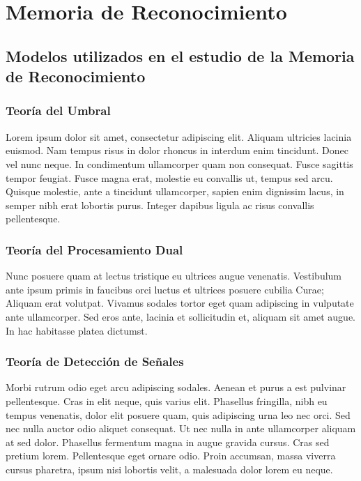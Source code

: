 
\chapter{Memoria de Reconocimiento} %

\label{Cap_RM} %


\section{Modelos utilizados en el estudio de la Memoria de Reconocimiento}

\subsection{Teoría del Umbral}

Lorem ipsum dolor sit amet, consectetur adipiscing elit. Aliquam ultricies lacinia euismod. Nam tempus risus in dolor rhoncus in interdum enim tincidunt. Donec vel nunc neque. In condimentum ullamcorper quam non consequat. Fusce sagittis tempor feugiat. Fusce magna erat, molestie eu convallis ut, tempus sed arcu. Quisque molestie, ante a tincidunt ullamcorper, sapien enim dignissim lacus, in semper nibh erat lobortis purus. Integer dapibus ligula ac risus convallis pellentesque.

\subsection{Teoría del Procesamiento Dual}

Nunc posuere quam at lectus tristique eu ultrices augue venenatis. Vestibulum ante ipsum primis in faucibus orci luctus et ultrices posuere cubilia Curae; Aliquam erat volutpat. Vivamus sodales tortor eget quam adipiscing in vulputate ante ullamcorper. Sed eros ante, lacinia et sollicitudin et, aliquam sit amet augue. In hac habitasse platea dictumst.


\subsection{Teoría de Detección de Señales}
Morbi rutrum odio eget arcu adipiscing sodales. Aenean et purus a est pulvinar pellentesque. Cras in elit neque, quis varius elit. Phasellus fringilla, nibh eu tempus venenatis, dolor elit posuere quam, quis adipiscing urna leo nec orci. Sed nec nulla auctor odio aliquet consequat. Ut nec nulla in ante ullamcorper aliquam at sed dolor. Phasellus fermentum magna in augue gravida cursus. Cras sed pretium lorem. Pellentesque eget ornare odio. Proin accumsan, massa viverra cursus pharetra, ipsum nisi lobortis velit, a malesuada dolor lorem eu neque.

